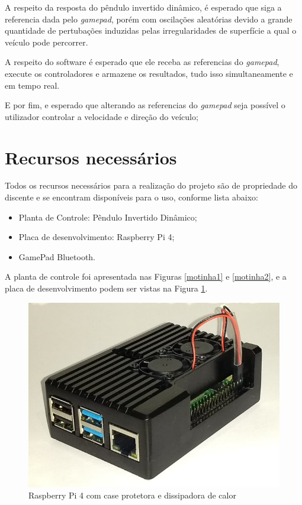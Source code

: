 \documentclass[conference,harvard,brazil,english]{sbatex}
\begin{document}
        A respeito da resposta do pêndulo invertido dinâmico, é esperado que siga a referencia dada pelo \textit{gamepad}, porém com oscilações aleatórias devido a grande quantidade de pertubações induzidas pelas irregularidades de superfície a qual o veículo pode percorrer.
        
        A respeito do software é esperado que ele receba as referencias do \textit{gamepad}, execute os controladores e armazene os resultados, tudo isso simultaneamente e em tempo real.
        
        E por fim, e esperado que alterando as referencias do \textit{gamepad} seja possível o utilizador controlar a velocidade e direção do veículo;
        
    \section{Recursos necessários}
        
        Todos os recursos necessários para a realização do projeto são de propriedade do discente e se encontram disponíveis para o uso, conforme lista abaixo:
        \begin{itemize}
            \item Planta de Controle: Pêndulo Invertido Dinâmico;
            \item Placa de desenvolvimento: Raspberry Pi 4;
            \item GamePad Bluetooth.
        \end{itemize}
        
       A planta de controle foi apresentada nas Figuras \ref{motinha1} e \ref{motinha2}, e a placa de desenvolvimento podem ser vistas na Figura \ref{pi}.
        
        \begin{figure}[H] 
        \centering \includegraphics[width=\columnwidth]{imagens/rasp.jpg}{
            \small
            \centering
            \caption{Raspberry Pi 4 com case protetora e dissipadora de calor}
            \label{pi}}
        \end{figure}
        
\end{document}
